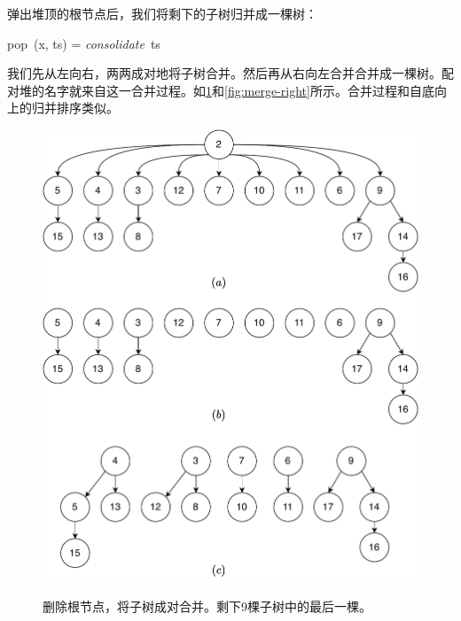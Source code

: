 \documentclass[b5paper]{ctexart}
\begin{document}
弹出堆顶的根节点后，我们将剩下的子树归并成一棵树：

\be
pop\ (x, ts) = \textit{consolidate}\ ts
\ee

我们先从左向右，两两成对地将子树合并。然后再从右向左合并合并成一棵树。配对堆的名字就来自这一合并过程。如\cref{fig:merge-pairs}和\cref{fig:merge-right}所示。合并过程和自底向上的归并排序\cite{okasaki-book}类似。

\begin{figure}[htbp]
  \centering
  \includegraphics[scale=0.5]{img/pairs-merge} \\
  \caption{删除根节点，将子树成对合并。剩下9棵子树中的最后一棵。}
  \label{fig:merge-pairs}
\end{figure}
\end{document}
